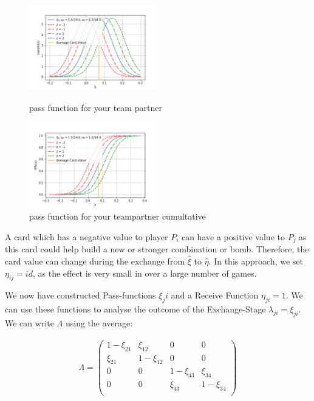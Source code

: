 \begin{figure}[h]
    \centering
    \includegraphics[width=0.5\textwidth]{Bilder/pass_function_p}
    \caption{pass function for your team partner}
    \label{fig:6}
    \centering
    \includegraphics[width=0.5\textwidth]{Bilder/pass_function_p_cumultative}
    \caption{pass function for your teampartner cumultative}
    \label{fig:7}
\end{figure}

A card which has a negative value to player $P_i$ can have a positive value to $P_j$ as this card could help build a new or stronger combination or bomb. Therefore, the card value can change during the exchange from $\hat{\xi}$ to $\hat{\eta}$. In this approach, we set $\eta_{ij} = id$, as the effect is very small in over a large number of games. 

We now have constructed Pass-functions $\xi_ji$ and a Receive Function $\eta_{ji} = 1$. We can use these functions to analyse the outcome of the Exchange-Stage $\lambda_{ji} = \xi_{ji}$. We can write $\Lambda$ using the average:

\begin{gather*}
\Lambda = \begin{pmatrix} 
1 - \xi_{21} & \xi_{12} & 0 & 0 \\
\xi_{21} & 1 - \xi_{12} & 0 & 0 \\
0 & 0 & 1 -  \xi_{43} & \xi_{34} \\
0 & 0 &  \xi_{43} & 1 - \xi_{34} \\
\end{pmatrix}
\end{gather*}

